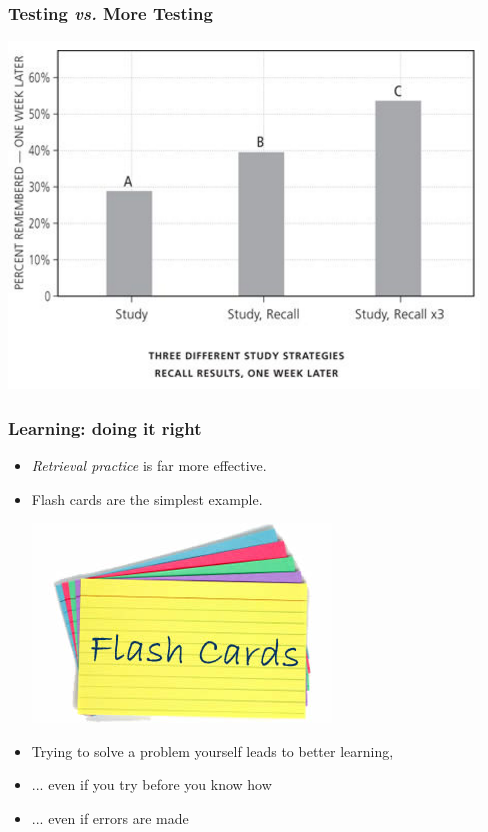 \documentclass{beamer}
\newcommand{\bi}{\begin{itemize}}
\newcommand{\li}{\item}
\newcommand{\ei}{\end{itemize}}
\newcommand{\bfr}[1]{\begin{frame}[fragile]\frametitle{{ #1 }}}
\begin{document}
\bfr{Testing {\em vs.} More Testing}
\includegraphics[width=\textwidth]{test3times.png}
\end{frame}

\bfr{Learning: doing it right}
\bi
\li {\em Retrieval practice} is far more effective.
\li Flash cards are the simplest example.
\centerline{\includegraphics[scale=1.0]{flashcards.jpg}}
\li Trying to solve a problem yourself
leads to better learning,

\li ... even if you try before you know how
\li ... even if errors are made

\ei


\end{frame}

\end{document}
